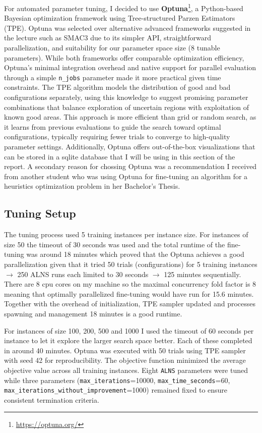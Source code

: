 \documentclass[a4paper]{scrartcl}
\begin{document}
For automated parameter tuning, I decided to use \textbf{Optuna}\footnote{\url{https://optuna.org/}},
a Python-based Bayesian optimization framework using Tree-structured Parzen Estimators (TPE).
Optuna was selected over alternative advanced frameworks suggested in the lecture such as SMAC3 due to its simpler API,
straightforward parallelization, and suitability for our parameter space size (8 tunable parameters).
While both frameworks offer comparable optimization efficiency, Optuna's minimal integration overhead and native support
for parallel evaluation through a simple \texttt{n\_jobs} parameter made it more practical given time constraints.
The TPE algorithm models the distribution of good and bad configurations separately, using this knowledge to suggest
promising parameter combinations that balance exploration of uncertain regions with exploitation of known good areas.
This approach is more efficient than grid or random search, as it learns from previous evaluations to guide the search
toward optimal configurations, typically requiring fewer trials to converge to high-quality parameter settings.
Additionally, Optuna offers out-of-the-box visualizations that can be stored in a sqlite database that I will be using
in this section of the report.
A secondary reason for chossing Optuna was a recommendation I received from another student who was using Optuna
for fine-tuning an algorithm for a heuristics optimization problem in her Bachelor's Thesis.

\subsection{Tuning Setup}

The tuning process used 5 training instances per instance size.
For instances of size 50 the timeout of 30 seconds was used and the total runtime of the fine-tuning was around 18
minutes which proved that the Optuna achieves a good parallelization given that it tried 50 trials (configurations)
for 5 training instances $\rightarrow$ 250 ALNS runs each limited to 30 seconds $\rightarrow$ 125 minutes sequentially.
There are 8 cpu cores on my machine so the maximal concurrency fold factor is 8 meaning that optimally parallelized
fine-tuning would have run for 15.6 minutes.
Together with the overhead of initialization, TPE sampler updated and processes spawning and management 18 minutes is
a good runtime.

For instances of size 100, 200, 500 and 1000 I used the timeout of 60 seconds per instance to let it explore the larger
search space better.
Each of these completed in around 40 minutes.
Optuna was executed with 50 trials using TPE sampler with seed 42 for reproducibility.
The objective function minimized the average objective value across all training instances.
Eight \texttt{ALNS} parameters were tuned while three parameters
(\texttt{max\_iterations}=10000, \texttt{max\_time\_seconds}=60, \texttt{max\_iterations\_without\_improvement}=1000)
remained fixed to ensure consistent termination criteria.
\end{document}

